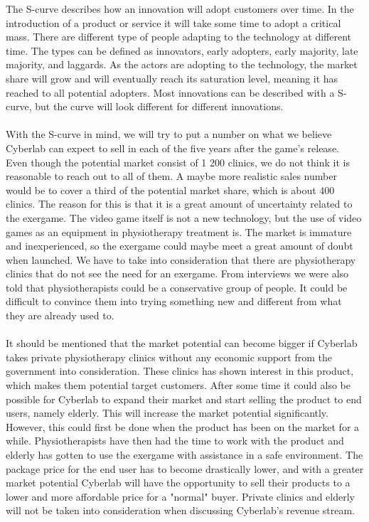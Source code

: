 The S-curve describes how an innovation will adopt customers over time. In the introduction of a product or service it will take some time to adopt a critical mass. There are different type of people adapting to the technology at different time. The types can be defined as innovators, early adopters, early majority, late majority, and laggards. As the actors are adopting to the technology, the market share will grow and will eventually reach its saturation level, meaning it has reached to all potential adopters. Most innovations can be described with a S-curve, but the curve will look different for different innovations.\cite{scurve}\\ \\
With the S-curve in mind, we will try to put a number on what we believe Cyberlab can expect to sell in each of the five years after the game’s release. Even though the potential market consist of 1 200 clinics, we do not think it is reasonable to reach out to all of them. A maybe more realistic sales number would be to cover a third of the potential market share, which is about 400 clinics. The reason for this is that it is a great amount of uncertainty related to the exergame. The video game itself is not a new technology, but the use of video games as an equipment in physiotherapy treatment is. The market is immature and inexperienced, so the exergame could maybe meet a great amount of doubt when launched. We have to take into consideration that there are physiotherapy clinics that do not see the need for an exergame. From interviews we were also told that physiotherapists could be a conservative group of people. It could be difficult to convince them into trying something new and different from what they are already used to. \\ \\ 
It should be mentioned that the market potential can become bigger if Cyberlab takes private physiotherapy clinics without any economic support from the government into consideration. These clinics has shown interest in this product, which makes them potential target customers. After some time it could also be possible for Cyberlab to expand their market and start selling the product to end users, namely elderly. This will increase the market potential significantly. However, this could first be done when the product has been on the market for a while. Physiotherapists have then had the time to work with the product and elderly has gotten to use the exergame with assistance in a safe environment. The package price for the end user has to become drastically lower, and with a greater market potential Cyberlab will have the opportunity to sell their products to a lower and more affordable price for a "normal" buyer. Private clinics and elderly will not be taken into consideration when discussing Cyberlab's revenue stream.\\ \\
